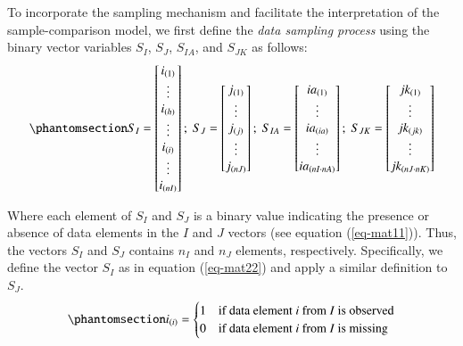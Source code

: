 \documentclass[
  authoryear,
  review,
  1p]{elsarticle}
\begin{document}
To incorporate the sampling mechanism and facilitate the interpretation
of the sample-comparison model, we first define the \emph{data sampling
process} using the binary vector variables \(S_{I}\), \(S_{J}\),
\(S_{IA}\), and \(S_{JK}\) as follows:
\begin{equation}\phantomsection\label{eq-mat21}{
S_{I} = \begin{bmatrix}
i_{(1)} \\
\vdots \\
i_{(h)} \\
\vdots \\
i_{(i)} \\
\vdots \\
i_{(nI)}
\end{bmatrix} ; \;
S_{J} = \begin{bmatrix}
j_{(1)} \\
\vdots \\
j_{(j)} \\
\vdots \\
j_{(nJ)}
\end{bmatrix} ; \;
S_{IA} = \begin{bmatrix}
ia_{(1)} \\
\vdots \\
ia_{(ia)} \\
\vdots \\
ia_{(nI \cdot nA)} \\
\end{bmatrix} ; \;
S_{JK} = \begin{bmatrix}
jk_{(1)} \\
\vdots \\
jk_{(jk)} \\
\vdots \\
jk_{(nJ \cdot nK)} \\
\end{bmatrix}
}\end{equation}

Where each element of \(S_{I}\) and \(S_{J}\) is a binary value
indicating the presence or absence of data elements in the \(I\) and
\(J\) vectors (see equation (\ref{eq-mat11})). Thus, the vectors
\(S_{I}\) and \(S_{J}\) contains \(n_{I}\) and \(n_{J}\) elements,
respectively. Specifically, we define the vector \(S_{I}\) as in
equation (\ref{eq-mat22}) and apply a similar definition to \(S_{J}\).
\begin{equation}\phantomsection\label{eq-mat22}{
i_{(i)} = \begin{cases} 
1 & \text{if data element } i \text{ from } I \text{ is observed} \\
0 & \text{if data element } i \text{ from } I \text{ is missing}
\end{cases}
}\end{equation}
\end{document}
